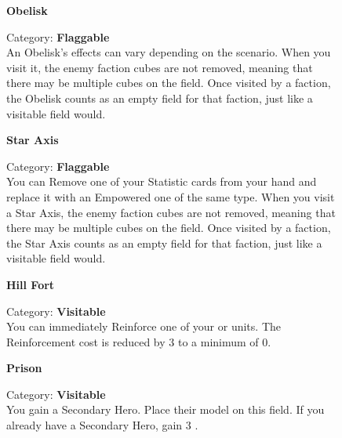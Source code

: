 \begin{figure}[h]
  \begin{minipage}[t]{0.48\textwidth}
    \centering
    \textbf{Obelisk}\\
    \caption{Category: \textbf{Flaggable}\\
      An Obelisk's effects can vary depending on the scenario.
      When you visit it, the enemy faction cubes are not removed, meaning that there may be multiple cubes on the field.
      Once visited by a faction, the Obelisk counts as an empty field for that faction, just like a visitable field would.}
  \end{minipage}\hfill
  \begin{minipage}[t]{0.48\textwidth}
    \centering
    \textbf{Star Axis}\\
    \caption{Category: \textbf{Flaggable}\\
      You can Remove one of your Statistic cards from your hand and replace it with an Empowered one of the same type.
      When you visit a Star Axis, the enemy faction cubes are not removed, meaning that there may be multiple cubes on the field.
      Once visited by a faction, the Star Axis counts as an empty field for that faction, just like a visitable field would.
    }
  \end{minipage}
\end{figure}

\begin{figure}
  \begin{minipage}[t]{0.48\textwidth}
    \centering
    \textbf{Hill Fort}\\
    \caption{Category: \textbf{Visitable}\\
      You can immediately Reinforce one of your  or  units.
      The Reinforcement cost is reduced by 3  to a minimum of 0.}
  \end{minipage}\hfill
  \begin{minipage}[t]{0.48\textwidth}
    \centering
    \textbf{Prison}\\
    \caption{Category: \textbf{Visitable}\\
      You gain a Secondary Hero.
      Place their model on this field.
      If you already have a Secondary Hero, gain 3 .}
  \end{minipage}
\end{figure}

